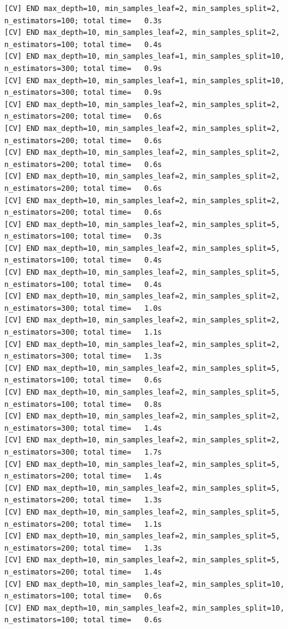 \documentclass[
  11pt,
  letterpaper,
  DIV=11,
  numbers=noendperiod]{scrartcl}
\begin{document}
\begin{verbatim}
[CV] END max_depth=10, min_samples_leaf=2, min_samples_split=2, n_estimators=100; total time=   0.3s
[CV] END max_depth=10, min_samples_leaf=2, min_samples_split=2, n_estimators=100; total time=   0.4s
[CV] END max_depth=10, min_samples_leaf=1, min_samples_split=10, n_estimators=300; total time=   0.9s
[CV] END max_depth=10, min_samples_leaf=1, min_samples_split=10, n_estimators=300; total time=   0.9s
[CV] END max_depth=10, min_samples_leaf=2, min_samples_split=2, n_estimators=200; total time=   0.6s
[CV] END max_depth=10, min_samples_leaf=2, min_samples_split=2, n_estimators=200; total time=   0.6s
[CV] END max_depth=10, min_samples_leaf=2, min_samples_split=2, n_estimators=200; total time=   0.6s
[CV] END max_depth=10, min_samples_leaf=2, min_samples_split=2, n_estimators=200; total time=   0.6s
[CV] END max_depth=10, min_samples_leaf=2, min_samples_split=2, n_estimators=200; total time=   0.6s
[CV] END max_depth=10, min_samples_leaf=2, min_samples_split=5, n_estimators=100; total time=   0.3s
[CV] END max_depth=10, min_samples_leaf=2, min_samples_split=5, n_estimators=100; total time=   0.4s
[CV] END max_depth=10, min_samples_leaf=2, min_samples_split=5, n_estimators=100; total time=   0.4s
[CV] END max_depth=10, min_samples_leaf=2, min_samples_split=2, n_estimators=300; total time=   1.0s
[CV] END max_depth=10, min_samples_leaf=2, min_samples_split=2, n_estimators=300; total time=   1.1s
[CV] END max_depth=10, min_samples_leaf=2, min_samples_split=2, n_estimators=300; total time=   1.3s
[CV] END max_depth=10, min_samples_leaf=2, min_samples_split=5, n_estimators=100; total time=   0.6s
[CV] END max_depth=10, min_samples_leaf=2, min_samples_split=5, n_estimators=100; total time=   0.8s
[CV] END max_depth=10, min_samples_leaf=2, min_samples_split=2, n_estimators=300; total time=   1.4s
[CV] END max_depth=10, min_samples_leaf=2, min_samples_split=2, n_estimators=300; total time=   1.7s
[CV] END max_depth=10, min_samples_leaf=2, min_samples_split=5, n_estimators=200; total time=   1.4s
[CV] END max_depth=10, min_samples_leaf=2, min_samples_split=5, n_estimators=200; total time=   1.3s
[CV] END max_depth=10, min_samples_leaf=2, min_samples_split=5, n_estimators=200; total time=   1.1s
[CV] END max_depth=10, min_samples_leaf=2, min_samples_split=5, n_estimators=200; total time=   1.3s
[CV] END max_depth=10, min_samples_leaf=2, min_samples_split=5, n_estimators=200; total time=   1.4s
[CV] END max_depth=10, min_samples_leaf=2, min_samples_split=10, n_estimators=100; total time=   0.6s
[CV] END max_depth=10, min_samples_leaf=2, min_samples_split=10, n_estimators=100; total time=   0.6s

\end{verbatim}
\end{document}
